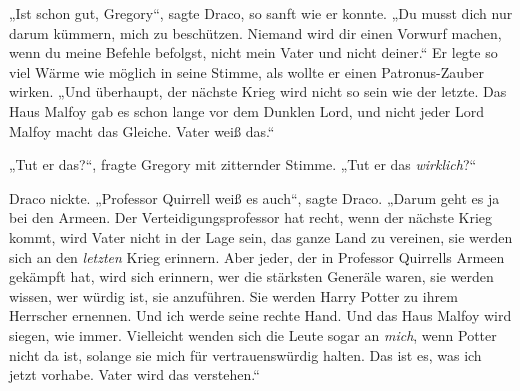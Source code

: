 „Ist schon gut, Gregory“, sagte Draco, so sanft wie er konnte. „Du musst dich nur darum kümmern, mich zu beschützen. Niemand wird dir einen Vorwurf machen, wenn du meine Befehle befolgst, nicht mein Vater und nicht deiner.“ Er legte so viel Wärme wie möglich in seine Stimme, als wollte er einen Patronus-Zauber wirken. „Und überhaupt, der nächste Krieg wird nicht so sein wie der letzte. Das Haus Malfoy gab es schon lange vor dem Dunklen Lord, und nicht jeder Lord Malfoy macht das Gleiche. Vater weiß das.“

„Tut er das?“, fragte Gregory mit zitternder Stimme. „Tut er das \emph{wirklich}?“

Draco nickte. „Professor Quirrell weiß es auch“, sagte Draco. „Darum geht es ja bei den Armeen. Der Verteidigungsprofessor hat recht, wenn der nächste Krieg kommt, wird Vater nicht in der Lage sein, das ganze Land zu vereinen, sie werden sich an den \emph{letzten} Krieg erinnern. Aber jeder, der in Professor Quirrells Armeen gekämpft hat, wird sich erinnern, wer die stärksten Generäle waren, sie werden wissen, wer würdig ist, sie anzuführen. Sie werden Harry Potter zu ihrem Herrscher ernennen. Und ich werde seine rechte Hand. Und das Haus Malfoy wird siegen, wie immer. Vielleicht wenden sich die Leute sogar an \emph{mich}, wenn Potter nicht da ist, solange sie mich für vertrauenswürdig halten. Das ist es, was ich jetzt vorhabe. Vater wird das verstehen.“

